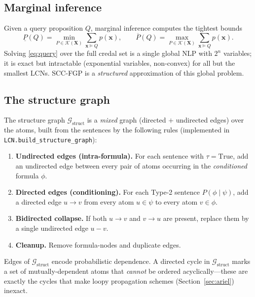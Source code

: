 \documentclass[11pt]{article}
\newcommand{\cK}{\mathcal{K}}
\newcommand{\cG}{\mathcal{G}}
\newcommand{\bX}{\mathbf{X}}
\newcommand{\bx}{\mathbf{x}}
\newcommand{\lo}{\underline}
\newcommand{\hi}{\overline}
\begin{document}
\subsection{Marginal inference}

Given a query proposition $Q$, marginal inference computes the tightest bounds
\begin{equation}\label{eq:query}
  \lo P(Q) = \min_{P\in\cK(\bX)} \!\!\sum_{\bx\models Q}\!\! p(\bx),
  \qquad
  \hi P(Q) = \max_{P\in\cK(\bX)} \!\!\sum_{\bx\models Q}\!\! p(\bx).
\end{equation}
Solving \eqref{eq:query} over the full credal set is a single global NLP with
$2^n$ variables; it is exact but intractable (exponential variables,
non-convex) for all but the smallest LCNs. SCC-FGP is a \emph{structured}
approximation of this global problem.

\subsection{The structure graph}\label{sec:struct}

The structure graph $\cG_{\text{struct}}$ is a \emph{mixed} graph (directed
$+$ undirected edges) over the atoms, built from the sentences by the
following rules (implemented in \texttt{LCN.build\_structure\_graph}):
\begin{enumerate}
  \item \textbf{Undirected edges (intra-formula).} For each sentence with
        $\tau=\text{True}$, add an undirected edge between every pair of atoms
        occurring in the \emph{conditioned} formula $\phi$.
  \item \textbf{Directed edges (conditioning).} For each Type-2 sentence
        $P(\phi\mid\psi)$, add a directed edge $u\!\to\!v$ from every atom
        $u\in\psi$ to every atom $v\in\phi$.
  \item \textbf{Bidirected collapse.} If both $u\!\to\!v$ and $v\!\to\!u$ are
        present, replace them by a single undirected edge $u\!-\!v$.
  \item \textbf{Cleanup.} Remove formula-nodes and duplicate edges.
\end{enumerate}
Edges of $\cG_{\text{struct}}$ encode probabilistic dependence. A directed
cycle in $\cG_{\text{struct}}$ marks a set of mutually-dependent atoms that
\emph{cannot} be ordered acyclically---these are exactly the cycles that make
loopy propagation schemes (Section~\ref{sec:ariel}) inexact.

\end{document}
